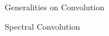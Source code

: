 \documentclass[../main.tex]{subfiles}
\begin{document}
    \begin{section}{Generalities on Convolution}
        \label{sec:3:1}
           
    \end{section}
    \begin{section}{Spectral Convolution}
           
    \end{section}
\end{document}
